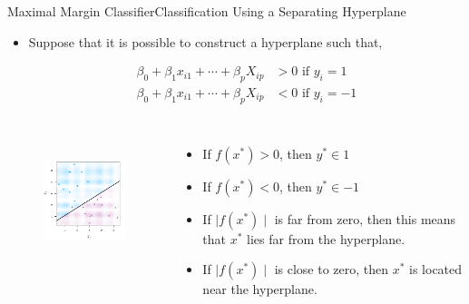 \begin{frame}{Maximal Margin Classifier}{Classification Using a Separating Hyperplane}
\begin{itemize}
        \item Suppose that it is possible to construct a hyperplane such that, \pause 

    \begin{align*}
            \beta_0 + \beta_1 x_{i1} +  \cdots + \beta_{p} X_{ip} &> 0 \text{ if } y_i = 1 \\ 
            \beta_0 + \beta_1 x_{i1} +  \cdots + \beta_{p} X_{ip} &< 0 \text{ if } y_i = -1
    \end{align*} \pause
        \end{itemize}


    \begin{columns}[T]

        \begin{figure}
        \centering
        \includegraphics[height=4cm]{mmc/hyperplane.png} \pause 
    \end{figure} 


    \begin{itemize}
        \item If $f(x^\ast) > 0$, then $y^\ast \in 1$ \pause  
        \item If $f(x^\ast) < 0$, then $y^\ast \in -1$ \pause  
        \item If $ \mid f(x^{\ast}) \mid $ is far from zero, then this means that $x^\ast$ lies far from the hyperplane. \pause 
        \item If $ \mid f(x^{\ast}) \mid $ is close to zero, then $x^\ast$ is located near the hyperplane.
    \end{itemize}
        
    \end{columns}


    
\end{frame}

